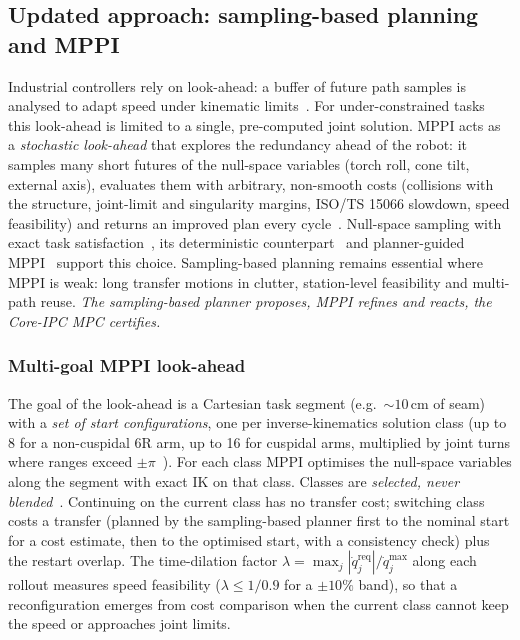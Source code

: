 \documentclass{plan4ari_report}
\begin{document}
\subsection{Updated approach: sampling-based planning and MPPI}
Industrial controllers rely on look-ahead: a buffer of future path samples is analysed to adapt speed under kinematic limits~\cite{lange2016pathaccurate}. For under-constrained tasks this look-ahead is limited to a single, pre-computed joint solution. MPPI acts as a \emph{stochastic look-ahead} that explores the redundancy ahead of the robot: it samples many short futures of the null-space variables (torch roll, cone tilt, external axis), evaluates them with arbitrary, non-smooth costs (collisions with the structure, joint-limit and singularity margins, ISO/TS 15066 slowdown, speed feasibility) and returns an improved plan every cycle~\cite{williams2018tro}. Null-space sampling with exact task satisfaction~\cite{wang2024constrainedpi,lee2026prmppi}, its deterministic counterpart~\cite{sun2024nullspacempc} and planner-guided MPPI~\cite{tao2023rrtmppi,trevisan2024biasedmppi} support this choice. Sampling-based planning remains essential where MPPI is weak: long transfer motions in clutter, station-level feasibility and multi-path reuse. \emph{The sampling-based planner proposes, MPPI refines and reacts, the Core-IPC MPC certifies.}

\subsubsection{Multi-goal MPPI look-ahead}
The goal of the look-ahead is a Cartesian task segment (e.g.\ ${\sim}10$\,cm of seam) with a \emph{set of start configurations}, one per inverse-kinematics solution class (up to 8 for a non-cuspidal 6R arm, up to 16 for cuspidal arms, multiplied by joint turns where ranges exceed $\pm\pi$~\cite{elias2025cuspidal}). For each class MPPI optimises the null-space variables along the segment with exact IK on that class. Classes are \emph{selected, never blended}~\cite{liu2026clusteringmppi,wang2026mppiem}. Continuing on the current class has no transfer cost; switching class costs a transfer (planned by the sampling-based planner first to the nominal start for a cost estimate, then to the optimised start, with a consistency check) plus the restart overlap. The time-dilation factor $\lambda=\max_j |\dot q_j^{\mathrm{req}}|/\dot q_j^{\max}$ along each rollout measures speed feasibility ($\lambda\le 1/0.9$ for a $\pm10\%$ band), so that a reconfiguration emerges from cost comparison when the current class cannot keep the speed or approaches joint limits.
\end{document}

